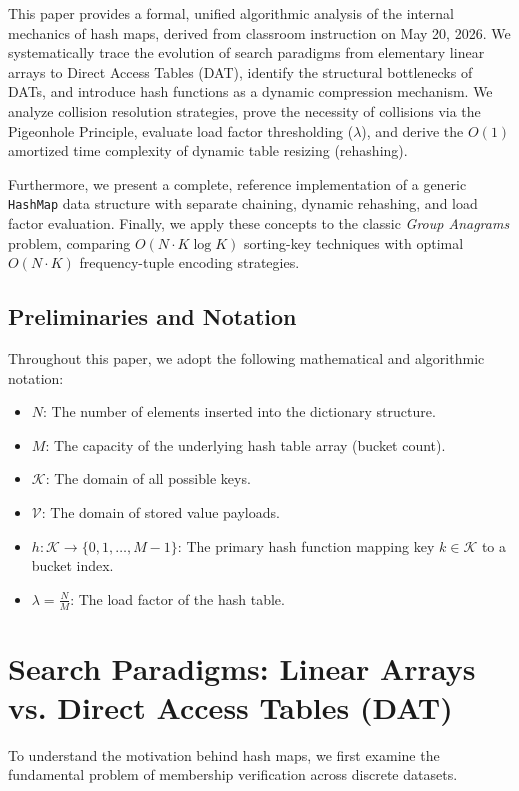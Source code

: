 \documentclass[10pt,journal,compsoc,onecolumn]{IEEEtran}
\begin{document}
This paper provides a formal, unified algorithmic analysis of the internal mechanics of hash maps, derived from classroom instruction on May 20, 2026. We systematically trace the evolution of search paradigms from elementary linear arrays to Direct Access Tables (DAT), identify the structural bottlenecks of DATs, and introduce hash functions as a dynamic compression mechanism. We analyze collision resolution strategies, prove the necessity of collisions via the Pigeonhole Principle, evaluate load factor thresholding ($\lambda$), and derive the $O(1)$ amortized time complexity of dynamic table resizing (rehashing).

Furthermore, we present a complete, reference implementation of a generic \texttt{HashMap} data structure with separate chaining, dynamic rehashing, and load factor evaluation. Finally, we apply these concepts to the classic \emph{Group Anagrams} problem, comparing $O(N \cdot K \log K)$ sorting-key techniques with optimal $O(N \cdot K)$ frequency-tuple encoding strategies.

\subsection{Preliminaries and Notation}

Throughout this paper, we adopt the following mathematical and algorithmic notation:
\begin{itemize}
    \item $N$: The number of elements inserted into the dictionary structure.
    \item $M$: The capacity of the underlying hash table array (bucket count).
    \item $\mathcal{K}$: The domain of all possible keys.
    \item $\mathcal{V}$: The domain of stored value payloads.
    \item $h: \mathcal{K} \to \{0, 1, \dots, M-1\}$: The primary hash function mapping key $k \in \mathcal{K}$ to a bucket index.
    \item $\lambda = \frac{N}{M}$: The load factor of the hash table.
\end{itemize}

\section{Search Paradigms: Linear Arrays vs. Direct Access Tables (DAT)}
\label{sec:search-paradigms}

To understand the motivation behind hash maps, we first examine the fundamental problem of membership verification across discrete datasets.
\end{document}
